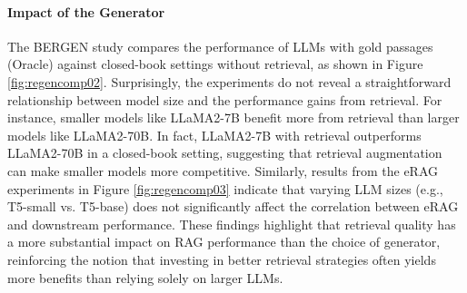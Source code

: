 \paragraph{Impact of the Generator} The BERGEN study \cite{rau2024bergen} compares the performance of LLMs with gold passages (Oracle) against closed-book settings without retrieval, as shown in Figure \ref{fig:regencomp02}. Surprisingly, the experiments do not reveal a straightforward relationship between model size and the performance gains from retrieval. For instance, smaller models like LLaMA2-7B benefit more from retrieval than larger models like LLaMA2-70B. In fact, LLaMA2-7B with retrieval outperforms LLaMA2-70B in a closed-book setting, suggesting that retrieval augmentation can make smaller models more competitive. Similarly, results from the eRAG experiments in Figure \ref{fig:regencomp03} indicate that varying LLM sizes (e.g., T5-small vs. T5-base) does not significantly affect the correlation between eRAG and downstream performance. These findings highlight that retrieval quality has a more substantial impact on RAG performance than the choice of generator, reinforcing the notion that investing in better retrieval strategies often yields more benefits than relying solely on larger LLMs.